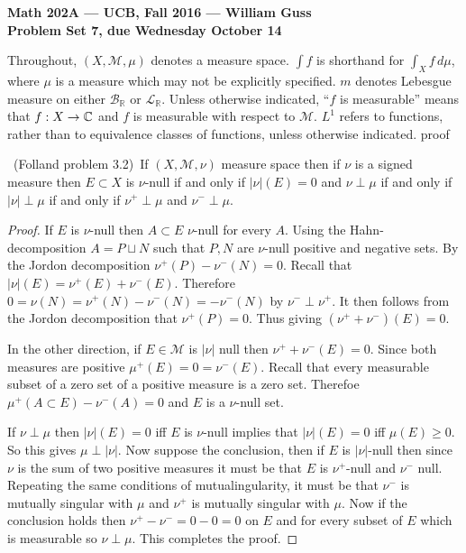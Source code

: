 \documentclass[11pt]{amsart}
\theoremstyle{definition}
\numberwithin{theorem}{section}
\numberwithin{definition}{section}
\numberwithin{equation}{section}
\def\reals{{\mathbb R}}
\def\complex{{\mathbb C}\/}
\def\scriptm{{\mathcal M}}
\def\scriptb{{\mathcal B}}
\def\scriptl{{\mathcal L}}
\begin{document}
\begin{center}{\bf Math 202A --- UCB, Fall 2016 --- William Guss}
\\
{\bf Problem Set 7, due Wednesday October 14}
\end{center}

\medskip
Throughout, $(X,\scriptm,\mu)$ denotes a measure space. 
$\int f$ is shorthand for $\int_X f\,d\mu$, where $\mu$ is a measure which
may not be explicitly specified. $m$ denotes Lebesgue measure on either $\scriptb_\reals$
or $\scriptl_\reals$. Unless otherwise indicated, ``$f$ is measurable'' means
that $f:X\to\complex$ and $f$ is measurable with respect to $\scriptm$.
$L^1$ refers to functions, rather than to equivalence classes of functions, unless
otherwise indicated.
proof

\medskip {}\ (Folland problem 3.2)\ 
	If $(X, \scriptm, \nu)$  measure space then if $\nu$ is a signed measure then $E \subset X$ is $\nu$-null if and only if
	$|\nu|(E) = 0$ and $\nu \perp \mu$ if and only if $|\nu| \perp \mu$ if and only if $\nu^+ \perp \mu$ and $\nu^- \perp \mu$. 
\begin{proof}
	If $E$ is $\nu$-null then $A \subset E$ $\nu$-null for every $A$. Using the Hahn-decomposition $A = P \sqcup N$
	such that $P, N$ are $\nu$-null positive and negative sets. By the Jordon decomposition $\nu^+(P) - \nu^-(N) = 0$. Recall that $|\nu|(E) = \nu^+(E) + \nu^-(E).$ Therefore $0 = \nu(N) = \nu^+(N) - \nu^-(N) = -\nu^-(N)$ by $\nu^- \perp \nu^+$. It then follows from the Jordon decomposition that $\nu^+(P) = 0$. Thus giving $(\nu^+ + \nu^-)(E) = 0$.

	In the other direction, if $E \in \scriptm$ is $|\nu|$ null then $\nu^+ + \nu^-(E) = 0$. Since both measures are positive
	$\mu^+(E) = 0 = \nu^-(E)$. Recall that every measurable subset of a zero set of a positive measure is a zero set. Therefoe $\mu^+(A \subset E) - \nu^-(A) = 0$ and $E$ is a $\nu$-null set. 

	If $\nu \perp \mu$ then $|\nu|(E) = 0$ iff $E$ is $\nu$-null implies that $|\nu|(E) = 0$ iff $\mu(E) \geq 0.$ So this gives $\mu \perp |\nu|.$ Now suppose the conclusion, then if $E$ is $|\nu|$-null then since $\nu$ is the sum of two positive measures it must be that $E$ is $\nu^+$-null and $\nu^-$ null. Repeating the same conditions of mutualingularity, it must be that $\nu^-$ is mutually singular with $\mu$ and $\nu^+$ is mutually singular with $\mu$. Now if the conclusion holds then $\nu^+ - \nu^- = 0 - 0 = 0$ on $E$ and for every subset of $E$ which is measurable so $\nu \perp \mu$. This completes the proof.

\end{proof}
\end{document}
